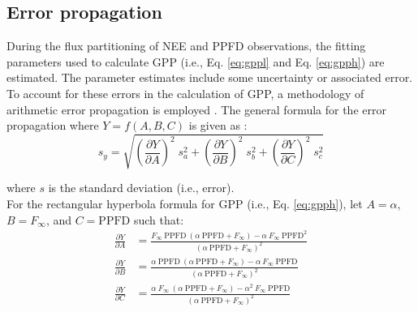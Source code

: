 \subsection{Error propagation}
\label{sec:mst1errprop}
During the flux partitioning of NEE and PPFD observations, the fitting parameters used to calculate GPP (i.e., Eq. \ref{eq:gppl} and Eq. \ref{eq:gpph}) are estimated.  
The parameter estimates include some uncertainty or associated error.  
To account for these errors in the calculation of GPP, a methodology of arithmetic error propagation is employed \parencite{caldwell14}.  
The general formula for the error propagation where $Y=f(A,B,C)$ is given as \parencite{ku66}:
\begin{equation}
\label{eq:errprop}
	s_{y} = \sqrt{
		\left(\frac{\partial Y}{\partial A}\right)^{2}\; s_{a}^{2} +
		\left(\frac{\partial Y}{\partial B}\right)^{2}\; s_{b}^{2} +
		\left(\frac{\partial Y}{\partial C}\right)^{2}\; s_{c}^{2}
		}
\end{equation}

\noindent where $s$ is the standard deviation (i.e., error).\\

For the rectangular hyperbola formula for GPP (i.e., Eq. \ref{eq:gpph}), let $A = \alpha$, $B = F_{\infty}$, and $C = \text{PPFD}$ such that:
\begin{subequations}
\label{eq:hpartial}
\begin{align}
    \frac{\partial Y}{\partial A}&= \frac{F_{\infty}\: \text{PPFD}\: 
                                    \left( \alpha\: \text{PPFD} + F_{\infty} 
                                    \right) - \alpha\: F_{\infty}\: 
                                    \text{PPFD}^{2}}{\left(\alpha\: 
                                    \text{PPFD} + F_{\infty} \right)^{2}} 
                                    \label{eq:hparta}\\
    \frac{\partial Y}{\partial B}&= \frac{\alpha\: \text{PPFD}\: 
                                    \left( \alpha\: \text{PPFD} + F_{\infty} 
                                    \right) - \alpha\: F_{\infty}\: 
                                    \text{PPFD}}{\left(\alpha\: 
                                    \text{PPFD} + F_{\infty} \right)^{2}} 
                                    \label{eq:hpartb}\\
    \frac{\partial Y}{\partial C}&= \frac{\alpha\: F_{\infty}\: 
                                    \left( \alpha\: \text{PPFD} + F_{\infty} 
                                    \right) - \alpha^{2}\: F_{\infty}\: 
                                    \text{PPFD}}{\left(\alpha\: 
                                    \text{PPFD} + F_{\infty} \right)^{2}}  
                                    \label{eq:hpartc}
\end{align}
\end{subequations}

